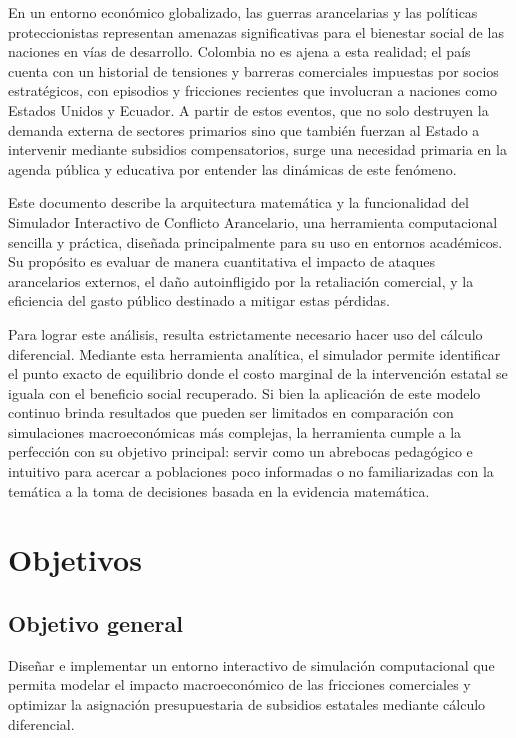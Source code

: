\documentclass[12pt, a4paper]{article}
\begin{document}
En un entorno económico globalizado, las guerras arancelarias y las políticas proteccionistas representan amenazas significativas para el bienestar social de las naciones en vías de desarrollo. Colombia no es ajena a esta realidad; el país cuenta con un historial de tensiones y barreras comerciales impuestas por socios estratégicos, con episodios y fricciones recientes que involucran a naciones como Estados Unidos y Ecuador. A partir de estos eventos, que no solo destruyen la demanda externa de sectores primarios sino que también fuerzan al Estado a intervenir mediante subsidios compensatorios, surge una necesidad primaria en la agenda pública y educativa por entender las dinámicas de este fenómeno.

Este documento describe la arquitectura matemática y la funcionalidad del Simulador Interactivo de Conflicto Arancelario, una herramienta computacional sencilla y práctica, diseñada principalmente para su uso en entornos académicos. Su propósito es evaluar de manera cuantitativa el impacto de ataques arancelarios externos, el daño autoinfligido por la retaliación comercial, y la eficiencia del gasto público destinado a mitigar estas pérdidas.

Para lograr este análisis, resulta estrictamente necesario hacer uso del cálculo diferencial. Mediante esta herramienta analítica, el simulador permite identificar el punto exacto de equilibrio donde el costo marginal de la intervención estatal se iguala con el beneficio social recuperado. Si bien la aplicación de este modelo continuo brinda resultados que pueden ser limitados en comparación con simulaciones macroeconómicas más complejas, la herramienta cumple a la perfección con su objetivo principal: servir como un abrebocas pedagógico e intuitivo para acercar a poblaciones poco informadas o no familiarizadas con la temática a la toma de decisiones basada en la evidencia matemática.

\section{Objetivos}

\subsection{Objetivo general}
Diseñar e implementar un entorno interactivo de simulación computacional que permita modelar el impacto macroeconómico de las fricciones comerciales y optimizar la asignación presupuestaria de subsidios estatales mediante cálculo diferencial.
\end{document}
